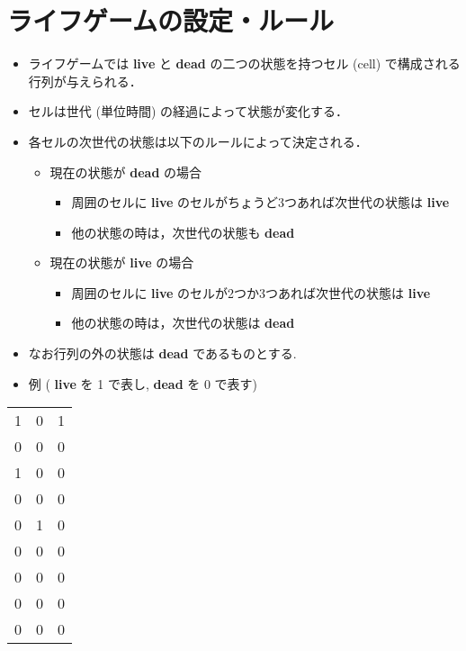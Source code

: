 \documentclass[a4j]{article}
\begin{document}
\section*{ライフゲームの設定・ルール}
\label{sec-2}

\begin{itemize}
\item ライフゲームでは \textbf{live} と \textbf{dead} の二つの状態を持つセル (cell) で構成される行列が与えられる．
\item セルは世代 (単位時間) の経過によって状態が変化する．
\item 各セルの次世代の状態は以下のルールによって決定される．
\begin{itemize}
\item 現在の状態が \textbf{dead} の場合
\begin{itemize}
\item 周囲のセルに \textbf{live} のセルがちょうど3つあれば次世代の状態は \textbf{live}
\item 他の状態の時は，次世代の状態も \textbf{dead}
\end{itemize}
\item 現在の状態が \textbf{live} の場合
\begin{itemize}
\item 周囲のセルに \textbf{live} のセルが2つか3つあれば次世代の状態は \textbf{live}
\item 他の状態の時は，次世代の状態は \textbf{dead}
\end{itemize}
\end{itemize}
\item なお行列の外の状態は \textbf{dead} であるものとする.
\item 例 ( \textbf{live} を 1 で表し,  \textbf{dead} を 0 で表す)
\end{itemize}


\begin{center}
\begin{tabular}{rrr}
\hline
 1  &  0  &  1  \\
 0  &  0  &  0  \\
 1  &  0  &  0  \\
\hline
\hline
 0  &  0  &  0  \\
 0  &  1  &  0  \\
 0  &  0  &  0  \\
\hline
\hline
 0  &  0  &  0  \\
 0  &  0  &  0  \\
 0  &  0  &  0  \\
\hline
\end{tabular}
\end{center}
\end{document}
